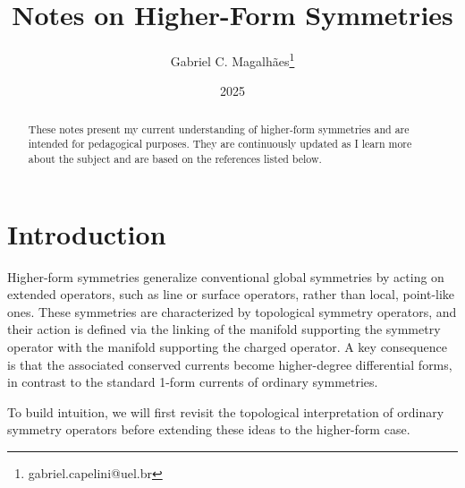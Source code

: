 \documentclass{article}
\title{Notes on Higher-Form Symmetries}
\author{Gabriel C. Magalhães\footnote{gabriel.capelini@uel.br}}
\date{2025}
\begin{document}
\maketitle

\begin{abstract}
These notes present  my current understanding of higher-form symmetries and are intended for pedagogical purposes. They are continuously updated as I learn more about the subject and are based on the references listed below.
\end{abstract}

\tableofcontents
\pagebreak

\section{Introduction}
Higher-form symmetries generalize conventional global symmetries by acting on extended operators, such as line or surface operators, rather than local, point-like ones. These symmetries are characterized by topological symmetry operators, and their action is defined via the linking of the manifold supporting the symmetry operator with the manifold supporting the charged operator. A key consequence is that the associated conserved currents become higher-degree differential forms, in contrast to the standard 1-form currents of ordinary symmetries.

To build intuition, we will first revisit the topological interpretation of ordinary symmetry operators before extending these ideas to the higher-form case.
\end{document}
